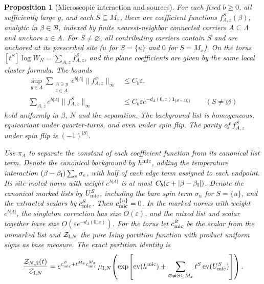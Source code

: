 \documentclass[11pt]{article}
\newtheorem{proposition}{Proposition}[section]
\theoremstyle{definition}
\begin{document}
\begin{proposition}[Microscopic interaction and sources]
\label{prop:microscopic-input}
For each fixed \(b\ge0\), all sufficiently large \(g\), and each
\(S\subseteq M_x\), there are coefficient functions
\(f^S_{A,z}(\beta)\), analytic in \(\beta\in\mathcal B\), indexed by finite
nearest-neighbor connected carriers \(A\subseteq\Lambda\) and
anchors \(z\in A\). For \(S\ne\varnothing\), all contributing
carriers contain \(S\) and are anchored at its prescribed site
(\(u\) for \(S=\{u\}\) and \(0\) for \(S=M_x\)). On the torus
\([t^S]\log W_N=\sum_{A,z} f^S_{A,z}\), and the plane coefficients
are given by the same local cluster formula. The bounds
\begin{equation}
 \begin{aligned}
 \sup_{y\in\Lambda}\sum_{\substack{A\ni y\\z\in A}}
     e^{b|A|}\|f^\varnothing_{A,z}\|_\infty&\le C_b\varepsilon,\\
 \sum_{A,z} e^{b|A|}\|f^S_{A,z}\|_\infty
    &\le C_b\varepsilon e^{-d_\Lambda(0,x)\mathbf 1_{\{S=M_x\}}}
       \qquad(S\ne\varnothing)
 \end{aligned}
 \label{eq:bulk-direct-carrier}
\end{equation}
hold uniformly in \(\beta\), \(N\) and the separation. The background
list is homogeneous, equivariant under quarter-turns, and even under
spin flip.
The parity of \(f^S_{A,z}\) under spin flip is \((-1)^{|S|}\).

Use \(\pi_A\) to separate the constant of each coefficient function
from its canonical list term. Denote the canonical background by
\(h^{\rm mic}\), adding
the temperature interaction
\((\beta-\beta_{\rm I})\sum_e\sigma_e\), with half of each edge term
assigned to each endpoint. Its site-rooted norm with weight
\(e^{b|A|}\) is at most \(C_b(\varepsilon+|\beta-\beta_{\rm I}|)\).
Denote the canonical marked lists by
\(U_{\rm mic}^S\), including the bare spin term \(\sigma_u\) for
\(S=\{u\}\), and the extracted scalars by \(c_{\rm mic}^S\).
Then \(c_{\rm mic}^{\{u\}}=0\). In the marked norms with
weight \(e^{b|A|}\), the singleton correction has size
\(O(\varepsilon)\), and the mixed list and scalar together have
size \(O(\varepsilon e^{-d_\Lambda(0,x)})\).
For the torus let \(c_{\rm mic}^{\varnothing}\) be the scalar from
the unmarked list and \(\mathcal Z_{{\rm I},N}\) the pure Ising
partition function with product uniform signs as base measure.
The exact partition identity is
\begin{equation}
 \frac{\mathcal Z_{N,\beta}(t)}{\mathcal Z_{{\rm I},N}}
 =
 e^{c_{\rm mic}^{\varnothing}+t^{M_x}c_{\rm mic}^{M_x}}
 \,\mu_{{\rm I},N}\!\left(
   \exp\!\left[\operatorname{ev}(h^{\rm mic})
         +\sum_{\varnothing\ne S\subseteq M_x}
                     t^S\operatorname{ev}(U_{\rm mic}^S)\right]\right).
 \label{eq:mic-partition}
\end{equation}
\end{proposition}
\end{document}
